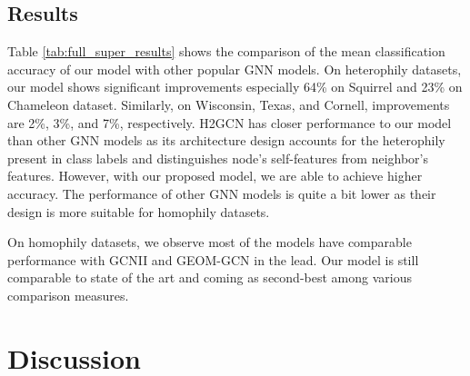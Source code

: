 \documentclass[sigconf,natbib=false]{acmart}
\begin{document}
\subsection{Results}
Table \ref{tab:full_super_results} shows the comparison of the mean classification accuracy of our model with other popular GNN models. On heterophily datasets, our model shows significant improvements especially 64\% on Squirrel and 23\% on Chameleon dataset. Similarly, on Wisconsin, Texas, and Cornell, improvements are 2\%, 3\%, and 7\%, respectively. H2GCN has closer performance to our model than other GNN models as its architecture design accounts for the heterophily present in class labels and distinguishes node's self-features from neighbor's features. However, with our proposed model, we are able to achieve higher accuracy. The performance of other GNN models is quite a bit lower as their design is more suitable for homophily datasets.

On homophily datasets, we observe most of the models have comparable performance with GCNII and GEOM-GCN in the lead. Our model is still comparable to state of the art and coming as second-best among various comparison measures. 







\section{Discussion}
\label{discussion}
\end{document}
